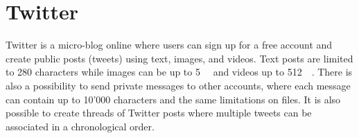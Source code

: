 \section{Twitter}
Twitter is a micro-blog online where users can sign up for a free account and create public posts (tweets) using text, images, and videos. Text posts are limited to 280 characters while images can be up to \SI{5}{\mega\byte} and videos up to \SI{512}{\mega\byte}\cite{MediaBestPractices}. There is also a possibility to send private messages to other accounts, where each message can contain up to 10'000 characters and the same limitations on files. It is also possible to create threads of Twitter posts where multiple tweets can be associated in a chronological order.